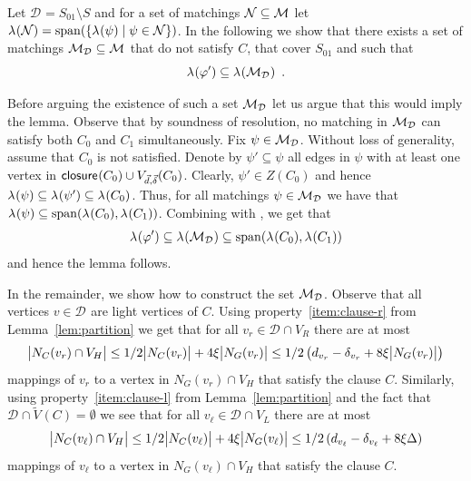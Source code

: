 \documentclass{theoretics}
\providecommand{\Abs}[1]{\bigl\lvert#1\bigr\rvert}
\newcommand{\set}[1]{\{ #1 \}}
\newcommand{\setdescr}[3][\mid]{\set{ #2 #1 #3 }}
\newcommand{\Setsize}[1]{\bigl\lvert#1\bigr\rvert}
\newcommand{\eqperiod}{\enspace .}
\newcommand{\reflem}[1]{Lemma~\ref{#1}}
\newcommand{\light}{light\xspace}
\newcommand{\neigh}[2][]{N_{{#1}}(#2)}
\newcommand{\diff}{\xi}
\newcommand{\GdegMax}{\Delta}
\newcommand{\gdegmax}{\GdegMax}
\newcommand{\V}[1][]{V_{#1}}
\newcommand{\Vl}{\V[L]}
\newcommand{\Vr}{\V[R]}
\newcommand{\Vh}{\V[H]}
\newcommand{\Vbad}[2][]{\widetilde V^{#1}(#2)}
\newcommand{\thr}[1]{ \ensuremath d_{{#1}} }
\newcommand{\vecthr}{\vec{d}}
\newcommand{\adv}[1]{\delta_{{#1}}}
\newcommand{\vecadv}{\vec{\delta}}
\newcommand{\linmap}[1][]{\ensuremath \lambda_{{#1}}}
\newcommand{\linmapof}[2][]{\linmap[#1](#2)}
\newcommand{\Vthick}[1]{\ensuremath V_{\vecthr,\vecadv}(#1)}
\newcommand{\closure}[2][]{\mathsf{closure}_{{#1}}(#2)}
\newcommand{\diffclosure}[1][]{D_{{#1}}}
\renewcommand{\diffclosure}[1][]{\mathcal{D}_{{#1}}}
\newcommand{\matchb}{\varphi'}
\newcommand{\matchc}{\psi}
\newcommand{\matchd}{\psi'}
\newcommand{\matchings}[1][]{\ensuremath \mathcal{M}_{{#1}}}
\newcommand{\spans}[1]{\mathrm{span} ( #1 )}
\numberwithin{equation}{section}
\begin{document}
  Let $\diffclosure = S_{01} \setminus S$ and for a set of matchings
  $\mathcal{N} \subseteq \matchings$ let 
  $\linmapof{ \mathcal{N} } = 
  \spans{ \setdescr{ \linmapof{\matchc} }
  { \matchc \in \mathcal{N} } } $.
  In the following we show that there exists a set of matchings
  $\matchings[\diffclosure] \subseteq \matchings$ 
  that do not satisfy $C$, that cover $S_{01}$
  and such that
  \begin{equation} \label{eq:good_set}
    \linmapof{\matchb} \subseteq 
    \linmapof{ \matchings[\diffclosure] } \eqperiod
  \end{equation}

  Before arguing the existence of such a set
  $\matchings[\diffclosure]$ let us
  argue that this would imply the lemma.
  Observe that by soundness of resolution,
  no matching in $\matchings[\diffclosure]$ can satisfy 
  both $C_0$ and $C_1$ simultaneously. Fix $\matchc \in \matchings[\diffclosure]$. Without
  loss of generality, assume that $C_0$ is not satisfied. Denote
  by $\matchd \subseteq \matchc$ all edges in $\matchc$ with at least one
  vertex in 
  $\closure{C_0} \cup \Vthick{C_0}$. Clearly, $\matchd \in Z(C_0)$ and hence
  $\linmapof{\matchc} \subseteq \linmapof{\matchd} \subseteq \linmapof{C_0}$.
  Thus, for all matchings $\matchc \in \matchings[\diffclosure]$ we have that
  $\linmapof{\matchc} \subseteq \spans{\linmapof{C_0}, \linmapof{C_1} }$.
  Combining with , we get that
  \begin{equation}
    \linmapof{\matchb} \subseteq \linmapof{ \matchings[\diffclosure] } \subseteq 
    \spans{\linmapof{C_0}, \linmapof{C_1} }
  \end{equation}
  and hence the lemma follows.

  In the remainder, we show how to construct the set $\matchings[\diffclosure]$.
  Observe that all vertices $v \in \diffclosure$ are \light vertices of $C$. 
  Using property~\ref{item:clause-r}
  from \reflem{lem:partition} we get that for all $v_r \in \diffclosure \cap \Vr$
  there are at most
  \begin{equation}\label{eq:satC-r}
    	\Setsize{\neigh[C]{v_r} \cap \Vh } 
    	\le 1/2 
    	\Abs{ \neigh[C]{v_r} } + 4 \diff  \Abs{ \neigh[G]{v_r} }
    	\le 1/2 \left(\thr{v_r} - \adv{v_r} + 
    	8 \diff  \Abs{ \neigh[G]{v_r} } \right)
  \end{equation}
  mappings of $v_r$ to a vertex in $\neigh[G]{v_r} \cap \Vh$ 
  that satisfy the clause $C$.
  Similarly, using property~\ref{item:clause-l} from \reflem{lem:partition}
  and the fact that $\diffclosure \cap \Vbad{C} = \emptyset$
  we see that
  for all $v_\ell \in \diffclosure \cap \Vl$
  there are at most
  \begin{equation}\label{eq:satC-l}
        \Setsize{\neigh[C]{v_\ell} \cap \Vh } 
    	\le 1/2 
    	\Abs{ \neigh[C]{v_\ell} } + 4 \diff  \Abs{ \neigh[G]{v_\ell} }
    	\le 1/2 \left(\thr{v_\ell} - \adv{v_\ell} + 
    	8 \diff \gdegmax \right)
  \end{equation}
  mappings of $v_\ell$ to a vertex in $\neigh[G]{v_\ell} \cap \Vh$ 
  that satisfy the clause $C$.
  
\end{document}
